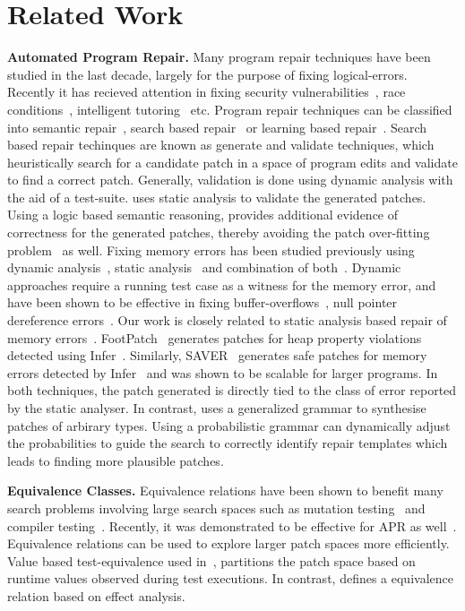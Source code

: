 \section{Related Work}
{\bf Automated Program Repair.}
Many program repair techniques have been studied in the last decade, largely  for the purpose of fixing logical-errors. Recently it has recieved attention in fixing security vulnerabilities~\cite{senx,extractfix}, race conditions~\cite{hippodrome}, intelligent tutoring~\cite{clara} etc. Program repair techniques can be classified into semantic repair~\cite{angelix,CPR}, search based repair~\cite{genprog,par} or learning based repair~\cite{prophet, sequencer}. Search based repair techinques are known as generate and validate techniques, which heuristically search for a candidate patch in a space of program edits and validate to find a correct patch. Generally, validation is done using dynamic analysis with the aid of a test-suite.  \tool  uses static analysis to validate the generated patches. Using a logic based semantic reasoning, \tool provides additional evidence of correctness for the generated patches, thereby avoiding the patch over-fitting problem~\cite{Qi15,Smith15} as well. 
Fixing memory errors has been studied previously using dynamic analysis~\cite{extractfix,senx,durieux17}, static analysis~\cite{Qing15,Junhee18,TonderG18,HongLLO20,Junhee2022} and combination of both~\cite{Hua16}. Dynamic approaches require a running test case as a witness for the memory error, and have been shown to be effective in fixing buffer-overflows~\cite{extractfix,senx}, null pointer dereference errors~\cite{durieux17}. Our work is closely related to static analysis based repair of memory errors~\cite{TonderG18,HongLLO20}. FootPatch~\cite{TonderG18} generates patches for heap property violations detected using Infer~\cite{infer}. Similarly, SAVER~\cite{HongLLO20} generates safe patches for memory errors detected by Infer~\cite{infer} and was shown to be scalable for larger programs. In both techniques, the patch generated is directly tied to the class of error reported by the static analyser. In contrast, \tool uses a generalized grammar to synthesise patches of arbirary types. Using a probabilistic grammar \tool can dynamically adjust the probabilities to guide the search to correctly identify repair templates which leads to finding more plausible patches. 


{\bf Equivalence Classes.} Equivalence relations have been shown to benefit many search problems involving large search spaces such as mutation testing~\cite{rene14,Ma16,Bo17} and compiler testing~\cite{vu14,Sun16}. Recently, it was demonstrated to be effective for APR as well~\cite{MechtaevGTR18}. Equivalence relations can be used to explore larger patch spaces more efficiently. Value based test-equivalence used in~\cite{MechtaevGTR18}, partitions the patch space based on runtime values observed during test executions. In contrast, \tool defines a equivalence relation based on effect analysis.


